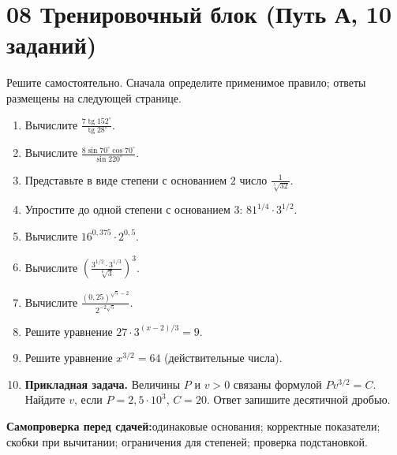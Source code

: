 \documentclass[a4paper,12pt]{article}
\newcommand{\tangent}{\operatorname{tg}}
\begin{document}
\section*{08 \quad Тренировочный блок \textnormal{(Путь А, 10 заданий)}}
\textcolor{textgray}{Решите самостоятельно. Сначала определите применимое правило; ответы размещены на следующей странице.}
\begin{enumerate}
\item Вычислите $\displaystyle\frac{7\tangent152^\circ}{\tangent28^\circ}$.
\item Вычислите $\displaystyle\frac{8\sin70^\circ\cos70^\circ}{\sin220^\circ}$.
\item Представьте в виде степени с основанием $2$ число $\displaystyle\frac1{\sqrt[5]{32}}$.
\item Упростите до одной степени с основанием $3$: $\displaystyle 81^{1/4}\cdot3^{1/2}$.
\item Вычислите $\displaystyle16^{0{,}375}\cdot2^{0{,}5}$.
\item Вычислите $\displaystyle\left(\frac{3^{1/2}\cdot3^{1/3}}{\sqrt[6]{3}}\right)^3$.
\item Вычислите $\displaystyle\frac{(0{,}25)^{\sqrt5-2}}{2^{-2\sqrt5}}$.
\item Решите уравнение $\displaystyle 27\cdot3^{(x-2)/3}=9$.
\item Решите уравнение $\displaystyle x^{3/2}=64$ (действительные числа).
\item \textbf{Прикладная задача.} Величины $P$ и $v>0$ связаны формулой $Pv^{3/2}=C$. Найдите $v$, если $P=2{,}5\cdot10^3$, $C=20$. Ответ запишите десятичной дробью.
\end{enumerate}
\vfill
\textcolor{darkaccent}{\textbf{Самопроверка перед сдачей:}}\quad одинаковые основания; корректные показатели; скобки при вычитании; ограничения для степеней; проверка подстановкой.
\clearpage
\end{document}
